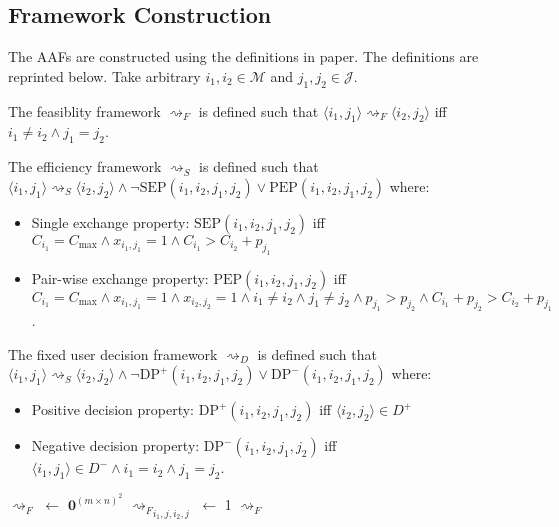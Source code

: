 \subsection{Framework Construction}

The AAFs are constructed using the definitions in paper.\cite{aes} The definitions are reprinted below. Take arbitrary $i_1,i_2\in\mathcal{M}$ and $j_1,j_2\in\mathcal{J}$.

\begin{definition}
	The feasiblity framework $\rightsquigarrow_F$ is defined such that $\langle i_1,j_1\rangle\rightsquigarrow_F\langle i_2,j_2\rangle$ iff $i_1\neq i_2\land j_1=j_2$.
\end{definition}

\begin{definition}
	The efficiency framework $\rightsquigarrow_S$ is defined such that $\langle i_1,j_1\rangle\rightsquigarrow_S\langle i_2,j_2\rangle\land\neg\text{SEP}(i_1,i_2,j_1,j_2)\lor\text{PEP}(i_1,i_2,j_1,j_2)$ where:
	\begin{itemize}
		\item Single exchange property: $\text{SEP}(i_1,i_2,j_1,j_2)$ iff $C_{i_1}=C_{\max}\land x_{i_1,j_1}=1\land C_{i_1}>C_{i_2}+p_{j_1}$
		\item Pair-wise exchange property: $\text{PEP}(i_1,i_2,j_1,j_2)$ iff $C_{i_1}=C_{\max}\land x_{i_1,j_1}=1\land x_{i_2,j_2}=1\land i_1\neq i_2\land j_1\neq j_2\land p_{j_1}>p_{j_2}\land C_{i_1}+p_{j_2}>C_{i_2}+p_{j_1}$.
	\end{itemize}
\end{definition}

\begin{definition}
	The fixed user decision framework $\rightsquigarrow_D$ is defined such that $\langle i_1,j_1\rangle\rightsquigarrow_S\langle i_2,j_2\rangle\land\neg\text{DP}^+(i_1,i_2,j_1,j_2)\lor\text{DP}^-(i_1,i_2,j_1,j_2)$ where:
	\begin{itemize}
		\item Positive decision property: $\text{DP}^+(i_1,i_2,j_1,j_2)$ iff $\langle i_2, j_2\rangle\in D^+$
		\item Negative decision property: $\text{DP}^-(i_1,i_2,j_1,j_2)$ iff $\langle i_1, j_1\rangle\in D^-\land i_1=i_2\land j_1=j_2$.
	\end{itemize}
\end{definition}

\begin{algorithm}
	\begin{algorithmic}[1]
			\State $\rightsquigarrow_F$ $\gets$ $\mathbf{0}^{(m\times n)^2}$
							\State ${\rightsquigarrow_F}_{i_1,j,i_2,j}$ $\gets$ 1
						\EndIf
					\EndFor
				\EndFor
			\EndFor
			\State \Return $\rightsquigarrow_F$
		\EndFunction
	\end{algorithmic}
\end{algorithm}

